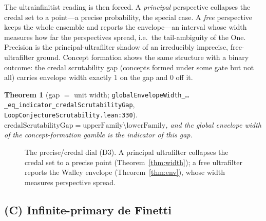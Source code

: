 \documentclass[]{article}
\newtheorem{theorem}{Theorem}
\theoremstyle{definition}
\theoremstyle{remark}
\newcommand{\code}[1]{\texttt{#1}}
\newcommand{\lpath}[1]{{\ttfamily\nolinkurl{#1}}}
\newcommand{\Uf}{\mathcal{U}}
\begin{document}
The ultrainfinitist reading is then forced. A \emph{principal} perspective collapses
the credal set to a point---a precise probability, the special case. A \emph{free}
perspective keeps the whole ensemble and reports the envelope---an interval whose
width measures how far the perspectives spread, i.e.\ the tail-ambiguity of the
One. Precision is the principal-ultrafilter shadow of an irreducibly imprecise,
free-ultrafilter ground. Concept formation shows the same structure with a binary
outcome: the credal scrutability gap (concepts formed under some gate but not all)
carries envelope width exactly $1$ on the gap and $0$ off it.

\begin{theorem}[gap $=$ unit width; \code{globalEnvelopeWidth\_\ldots\_eq\_indicator\_credalScrutabilityGap}, \lpath{LoopConjectureScrutability.lean:330}]
\label{thm:gap}
$\mathrm{credalScrutabilityGap}=\mathrm{upperFamily}\setminus\mathrm{lowerFamily}$,
and the global envelope width of the concept-formation gamble is the indicator of
this gap.
\end{theorem}

\begin{figure}[H]
\centering
{}
\caption{The precise/credal dial (D3). A principal ultrafilter collapses the credal
set to a precise point (Theorem~\ref{thm:width}); a free ultrafilter reports the
Walley envelope (Theorem~\ref{thm:env}), whose width measures perspective spread.}
\label{fig:credaldial}
\end{figure}

\subsection{(C) Infinite-primary de Finetti}
\label{sec:teethC}
\end{document}
